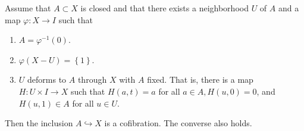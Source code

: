 \begin{theorem}[]\label{Thm:SJJDHW29WW}
    Assume that $A \subset X$ is closed and that there
    exists a neighborhood $U$ of $A$ and a map
    $\varphi  \colon X \to I$ such that
    \begin{enumerate}
        \item $A = \varphi ^{-1} (0)$.
        \item $\varphi \left( X-U \right) = \left\{ 1 \right\} $.
        \item $U$ deforms to $A$ through $X$ with $A$ fixed.
            That is, there is a map $H \colon U \times I \to X$ 
            such that $H(a,t) = a$ for all $a \in A, H
            (u,0) = 0$, and $H(u,1) \in A$ for all $u \in U$.
    \end{enumerate}
    Then the inclusion
    $A \hookrightarrow X$ is a cofibration. The converse also
    holds.
\end{theorem}

